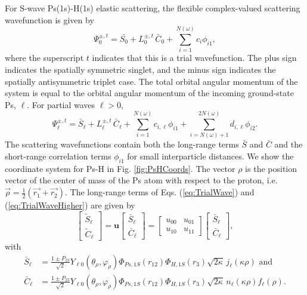 \documentclass[preprint,showpacs,preprintnumbers,amsmath,amssymb,longbibliography,pra,aps]{revtex4-1}
\begin{document}
For S-wave Ps(1s)-H(1s) elastic scattering, the flexible complex-valued scattering wavefunction is given by
\begin{equation}
\Psi_0^{\pm,t} = \bar{S_0} + L_0^{\pm,t} \, \bar{C}_0 + \sum_{i=1}^{N(\omega)} c_i \phi_{i1},
\label{eq:TrialWave}
\end{equation}
where the superscript $t$ indicates that this is a trial wavefunction. The plus sign indicates the spatially symmetric singlet, and the minus sign indicates the spatially antisymmetric triplet case. The total orbital angular momentum of the system is equal to the orbital angular momentum of the incoming ground-state Ps, $\ell$. For partial waves $\ell > 0$,
\begin{equation}
\Psi_\ell^{\pm,t} = \bar{S}_\ell + L^{\pm,t}_\ell \, \bar{C}_\ell + \sum_{i=1}^{N(\omega)} c_{i,\ell} \phi_{i1} + \!\!\!\sum_{i=N(\omega)+1}^{2N(\omega)} \!\! d_{i,\ell} \phi_{i2}.
\label{eq:TrialWaveHigher}
\end{equation}
The scattering wavefunctions contain both the long-range terms $\bar{S}$ and $\bar{C}$ and the short-range correlation terms $\phi_{i1}$ for small interparticle distances. We show the coordinate system for Ps-H in Fig. \ref{fig:PsHCoords}. The vector $\rho$ is the position vector of the center of mass of the Ps atom with respect to the proton, i.e. $\vec{\rho} = \frac{1}{2}\left(\vec{r_1} + \vec{r_2}\right)$. The long-range terms of Eqs. (\ref{eq:TrialWave}) and (\ref{eq:TrialWaveHigher}) are given by
\begin{equation}
\label{eq:SCPhiDef}
\begin{bmatrix}
\widetilde{S}_\ell \\ \widetilde{C}_\ell
\end{bmatrix} = \textbf{u}  \begin{bmatrix}
\bar{S}_\ell \\ \bar{C}_\ell
\end{bmatrix} = \begin{bmatrix}
u_{00} & u_{01} \\  u_{10} & u_{11}
\end{bmatrix}
\begin{bmatrix}
\bar{S}_\ell \\ \bar{C}_\ell
\end{bmatrix}, 
\end{equation}
with
\begin{subequations}
\label{eq:SCBarPhiDef}
\begin{align}
\bar{S}_\ell &= \frac{1\pm P_{23}}{\sqrt{2}}Y_{\ell 0}(\theta_\rho,\varphi_\rho)\Phi_{Ps,1S}\left(r_{12}\right) \Phi_{H,1S}\left(r_3\right) \sqrt{2\kappa} \,j_\ell\left(\kappa\rho\right) \text{ and} \label{eq:SBar} \\
\bar{C}_\ell &= \frac{1\pm P_{23}}{\sqrt{2}}Y_{\ell 0}(\theta_\rho,\varphi_\rho)\Phi_{Ps,1S}\left(r_{12}\right) \Phi_{H,1S}\left(r_3\right) \sqrt{2\kappa} \,n_\ell\left(\kappa\rho\right) f_\ell(\rho). \label{eq:CBar}
\end{align}
\end{subequations}
\end{document}
